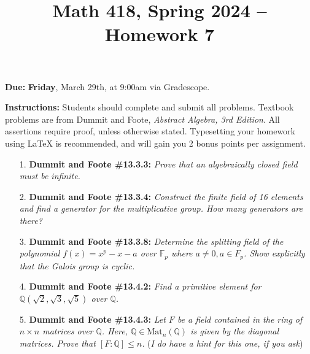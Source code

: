 \documentclass[12pt]{article}
\title{Math 418, Spring 2024 -- Homework 7}
\date{}
\newcommand{\Q}{\mathbb{Q}}
\newcommand{\F}{\mathbb{F}}
\newcommand{\Mat}{\text{Mat}}
\begin{document}
 \maketitle
\vspace{-80pt}

\textbf{Due:} \textbf{Friday}, March 29th, at 9:00am via Gradescope.

\textbf{Instructions:} Students should complete and submit all problems. Textbook problems are from Dummit and Foote, \emph{Abstract Algebra, 3rd Edition}. All assertions require proof, unless otherwise stated. Typesetting your homework using LaTeX is recommended, and will gain you 2 bonus points per assignment.

\begin{enumerate}


\item[1.] \textbf{Dummit and Foote \#13.3.3:} \textit{Prove that an algebraically closed field must be infinite.}

\item[2.] \textbf{Dummit and Foote \#13.3.4:} \textit{Construct the finite field of 16 elements and find a generator for the multiplicative group. How many generators are there?}

\item[3.] \textbf{Dummit and Foote \#13.3.8:} \textit{Determine the splitting field of the polynomial $f(x) = x^p - x - a$ over $\F_p$ where $a\ne 0, a\in F_p$. Show explicitly that the Galois group is cyclic.}

\item[4.] \textbf{Dummit and Foote \#13.4.2:} \textit{Find a primitive element for $\Q(\sqrt{2}, \sqrt{3}, \sqrt{5})$ over $\Q$.}

\item[5.] \textbf{Dummit and Foote \#13.4.3:} \textit{Let $F$ be a field contained in the ring of $n \times n$ matrices over $\Q$. Here, $\Q\in \Mat_n(\Q)$ is given by the diagonal matrices. Prove that $[F : \Q] \le n$.} (\emph{I do have a hint for this one, if you ask})

\end{enumerate}
\end{document}
